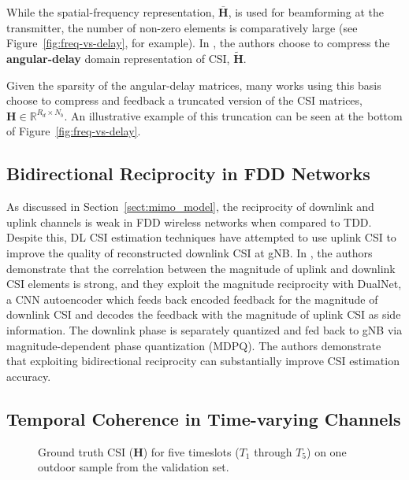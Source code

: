 While the spatial-frequency representation, $\bar{\mathbf H}$, is used for beamforming at the transmitter, the number of non-zero elements is comparatively large (see Figure~\ref{fig:freq-vs-delay}, for example). In \cite{ref:csinet}, the authors choose to compress the \textbf{angular-delay} domain representation of CSI, $\tilde{\mathbf H}$.

Given the sparsity of the angular-delay matrices, many works using this basis choose to compress and feedback a truncated version of the CSI matrices, $\mathbf H \in \mathbb R^{R_d \times N_b}$. An illustrative example of this truncation can be seen at the bottom of Figure~\ref{fig:freq-vs-delay}.

\subsection{Bidirectional Reciprocity in FDD Networks}

As discussed in Section~\ref{sect:mimo_model}, the reciprocity of downlink and uplink channels is weak in FDD wireless networks when compared to TDD. Despite this, DL CSI estimation techniques have attempted to use uplink CSI to improve the quality of reconstructed downlink CSI at gNB. In \cite{ref:dualnet}, the authors demonstrate that the correlation between the magnitude of uplink and downlink CSI elements is strong, and they exploit the magnitude reciprocity with DualNet, a CNN autoencoder which feeds back encoded feedback for the magnitude of downlink CSI and decodes the feedback with the magnitude of uplink CSI as side information. The downlink phase is separately quantized and fed back to gNB via magnitude-dependent phase quantization (MDPQ). The authors demonstrate that exploiting bidirectional reciprocity can substantially improve CSI estimation accuracy.

\subsection{Temporal Coherence in Time-varying Channels}

\begin{figure}[htb] \centering 
{
  \fontsize{10pt}{12pt}
  \def\svgwidth{1.0\columnwidth}
  
}
  \caption{Ground truth CSI ($\mathbf H$) for five timeslots ($T_1$ through $T_5$) on one outdoor sample from the validation set.} 
  \label{fig:csi_img_gt} 
\end{figure}

